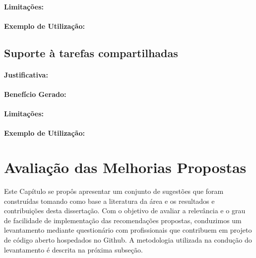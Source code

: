 \paragraph{Limitações:}
\label{par:limitacoes_s08}

\paragraph{Exemplo de Utilização:}
\label{par:exemplo_de_utilização_s08}

\subsection{Suporte à tarefas compartilhadas}
\label{sub:suporte_tarefas_compartilhadas}


\paragraph{Justificativa:}
\label{par:justificativa_s09}

\paragraph{Benefício Gerado:}
\label{par:papéis_afetados_s09}

\paragraph{Limitações:}
\label{par:limitacoes_s09}

\paragraph{Exemplo de Utilização:}
\label{par:exemplo_de_utilização_s09}



\section{Avaliação das Melhorias Propostas}
\label{sec:sug_melhoria_avaliacao_das_melhorias}

Este Capítulo se propôs apresentar um conjunto de sugestões que foram
construídas tomando como base a literatura da área e os resultados e
contribuições desta dissertação. Com o objetivo de avaliar a relevância e o grau
de facilidade de implementação das recomendações propostas, conduzimos um
levantamento mediante questionário com profissionais que contribuem em projeto
de código aberto hospedados no Github. A metodologia utilizada na condução do
levantamento é descrita na próxima subseção.

